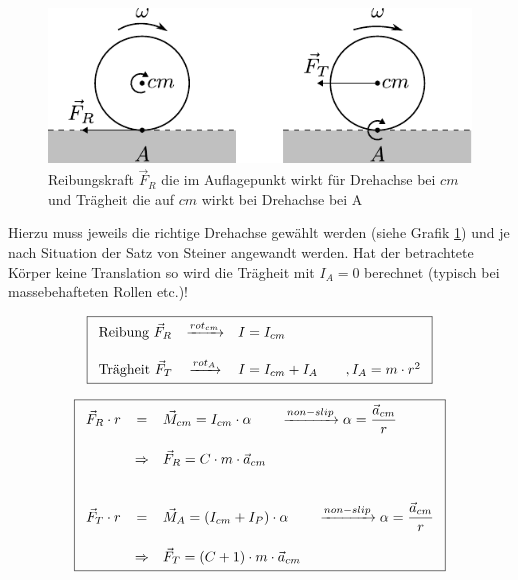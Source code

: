 \begin{figure}[h!]
	\centering
	\includegraphics[scale=0.8]{../fig/non-slip-kraft.pdf}
	\caption{Reibungskraft $\vec{F}_R$ die im Auflagepunkt 
		wirkt für Drehachse bei $cm$ und 
		Trägheit die auf $cm$ wirkt bei Drehachse bei A}
	\label{fig:non-slip-kraft}
\end{figure}

\noindent
Hierzu muss jeweils die richtige Drehachse gewählt werden (siehe
Grafik \ref{fig:non-slip-kraft}) und je nach Situation der Satz von
Steiner angewandt werden. Hat der betrachtete Körper keine Translation
so wird die Trägheit mit $I_A=0$ berechnet (typisch bei 
massebehafteten Rollen etc.)!

\[ \boxed{\begin{array}{l c l}
	\text{Reibung } \vec{F}_R 
		& \xrightarrow{rot_{cm}}
		& I = I_{cm} \\
	 & & \\
	\text{Trägheit } \vec{F}_T 
		& \xrightarrow{rot_A}
		& I = I_{cm} + I_A \qquad,I_A = m \cdot r^2
\end{array}}\]

\[ \boxed{\begin{array}{c c l}
	\vec{F}_R \cdot r 
		& =
		& \vec{M}_{cm} = I_{cm} \cdot \alpha 
		\qquad \xrightarrow{non-slip} 
			\displaystyle
			\alpha = \frac{\vec{a}_{cm}}{r} \\
	& & \\
		& \Rightarrow 
		& \vec{F}_R = C \cdot m \cdot \vec{a}_{cm} \\
	& & \\
	& & \\
	\vec{F}_T \cdot r 
		& = 
		& \vec{M}_{A} = (I_{cm} + I_P) \cdot \alpha
		\qquad \xrightarrow{non-slip}
			\displaystyle
			\alpha = \frac{\vec{a}_{cm}}{r} \\
	& & \\
		& \Rightarrow 
		& \vec{F}_T = (C + 1) \cdot m \cdot \vec{a}_{cm}
\end{array} } \]

